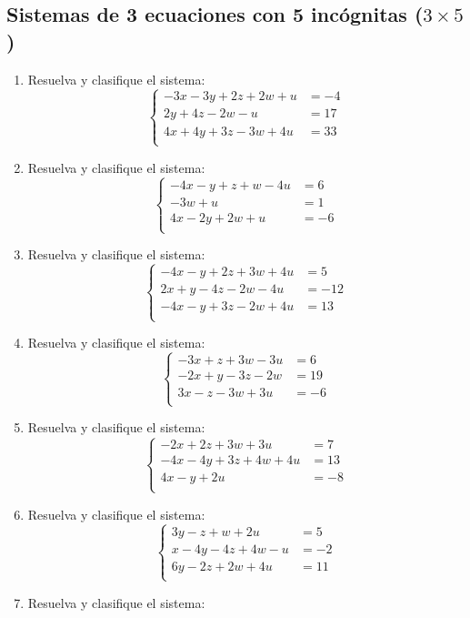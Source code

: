 \documentclass[11pt]{article}
\begin{document}
\subsection{Sistemas de 3 ecuaciones con 5 incógnitas ($ 3\times 5 $)}
\begin{enumerate}
\item Resuelva y clasifique el sistema:
\[
\left\{\begin{aligned}
-3x-3y+2z+2w+u&=-4\\
2y+4z-2w-u&=17\\
4x+4y+3z-3w+4u&=33\\
\end{aligned}\right.
\]
\item Resuelva y clasifique el sistema:
\[
\left\{\begin{aligned}
-4x-y+z+w-4u&=6\\
-3w+u&=1\\
4x-2y+2w+u&=-6\\
\end{aligned}\right.
\]
\item Resuelva y clasifique el sistema:
\[
\left\{\begin{aligned}
-4x-y+2z+3w+4u&=5\\
2x+y-4z-2w-4u&=-12\\
-4x-y+3z-2w+4u&=13\\
\end{aligned}\right.
\]
\item Resuelva y clasifique el sistema:
\[
\left\{\begin{aligned}
-3x+z+3w-3u&=6\\
-2x+y-3z-2w&=19\\
3x-z-3w+3u&=-6\\
\end{aligned}\right.
\]
\item Resuelva y clasifique el sistema:
\[
\left\{\begin{aligned}
-2x+2z+3w+3u&=7\\
-4x-4y+3z+4w+4u&=13\\
4x-y+2u&=-8\\
\end{aligned}\right.
\]
\item Resuelva y clasifique el sistema:
\[
\left\{\begin{aligned}
3y-z+w+2u&=5\\
x-4y-4z+4w-u&=-2\\
6y-2z+2w+4u&=11\\
\end{aligned}\right.
\]
\item Resuelva y clasifique el sistema:

\end{enumerate}
\end{document}
